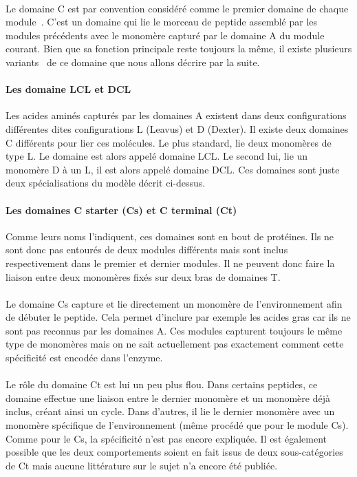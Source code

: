 \documentclass[12pt,french,twoside]{report}
\begin{document}
\paragraph{}Le domaine C est par convention considéré comme le premier domaine de chaque module~\cite{stachelhaus_peptide_1998}.
C'est un domaine qui lie le morceau de peptide assemblé par les modules précédents avec le monomère capturé par le domaine A du module courant.
Bien que sa fonction principale reste toujours la même, il existe plusieurs variants~\cite{rausch_phylogenetic_2007} de ce domaine que nous allons décrire par la suite.

\paragraph{Les domaine LCL et DCL}
Les acides aminés capturés par les domaines A existent dans deux configurations différentes dites configurations L (Leavus) et D (Dexter).
Il existe deux domaines C différents pour lier ces molécules.
Le plus standard, lie deux monomères de type L. Le domaine est alors appelé domaine LCL.
Le second lui, lie un monomère D à un L, il est alors appelé domaine DCL.
Ces domaines sont juste deux spécialisations du modèle décrit ci-dessus.

\paragraph{Les domaines C starter (Cs) et C terminal (Ct)}
Comme leurs noms l'indiquent, ces domaines sont en bout de protéines.
Ils ne sont donc pas entourés de deux modules différents mais sont inclus respectivement dans le premier et dernier modules.
Il ne peuvent donc faire la liaison entre deux monomères fixés sur deux bras de domaines T.

\paragraph{}Le domaine Cs capture et lie directement un monomère de l'environnement afin de débuter le peptide.
Cela permet d'inclure par exemple les acides gras car ils ne sont pas reconnus par les domaines A.
Ces modules capturent toujours le même type de monomères mais on ne sait actuellement pas exactement comment cette spécificité est encodée dans l'enzyme.

\paragraph{}Le rôle du domaine Ct est lui un peu plus flou.
Dans certains peptides, ce domaine effectue une liaison entre le dernier monomère et un monomère déjà inclus, créant ainsi un cycle\cite{gao_cyclization_2012}.
Dans d'autres, il lie le dernier monomère avec un monomère spécifique de l'environnement (même procédé que pour le module Cs).
Comme pour le Cs, la spécificité n'est pas encore expliquée.
Il est également possible que les deux comportements soient en fait issus de deux sous-catégories de Ct mais aucune littérature sur le sujet n'a encore été publiée.
\end{document}
